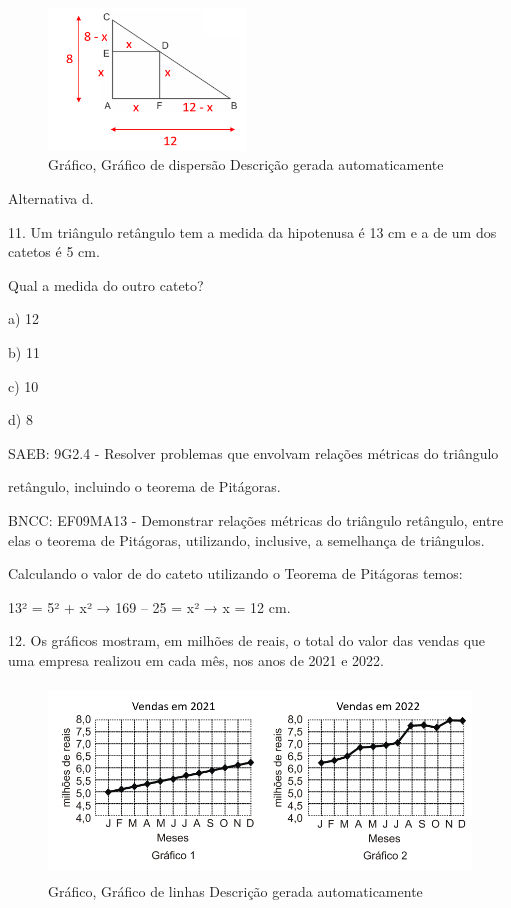 \begin{escolha}
{{{\begin{escolha}
{{{{{\begin{escolha}
\begin{escolha}
{\begin{q°}
\begin{figure}
\centering
\includegraphics[width=2.07292in,height=1.48748in]{./_SAEB_9_MAT/media/image268.png}
\caption{Gráfico, Gráfico de dispersão Descrição gerada automaticamente}
\end{figure}

Alternativa d.

11. Um triângulo retângulo tem a medida da hipotenusa é 13 cm e a de um
dos catetos é 5 cm.

Qual a medida do outro cateto?

a) 12

b) 11

c) 10

d) 8

SAEB: 9G2.4 - Resolver problemas que envolvam relações métricas do
triângulo

retângulo, incluindo o teorema de Pitágoras.

BNCC: EF09MA13 - Demonstrar relações métricas do triângulo retângulo,
entre elas o teorema de Pitágoras, utilizando, inclusive, a semelhança
de triângulos.

Calculando o valor de do cateto utilizando o Teorema de Pitágoras temos:

13² = 5² + x² → 169 -- 25 = x² → x = 12 cm.

12. Os gráficos mostram, em milhões de reais, o total do valor das
vendas que uma empresa realizou em cada mês, nos anos de 2021 e 2022.

\begin{figure}
\centering
\includegraphics[width=4.73437in,height=2.00699in]{./_SAEB_9_MAT/media/image269.png}
\caption{Gráfico, Gráfico de linhas Descrição gerada automaticamente}
\end{figure}


\end{q°}}
\end{escolha}
\end{escolha}}}}}}
\end{escolha}}}}
\end{escolha}

